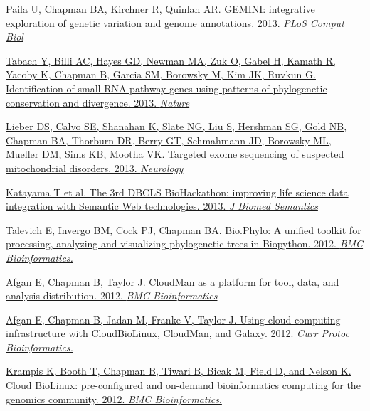 \documentclass[10pt]{article}
\makeatletter
\newlength{\bibhang}
\newlength{\bibsep}
 {\@listi \global\bibsep\itemsep \global\advance\bibsep by\parsep}
\newenvironment{bibsection}%
        {\vspace{-\baselineskip}\begin{list}{}{%
       \setlength{\leftmargin}{\bibhang}%
       \setlength{\itemindent}{-\leftmargin}%
       \setlength{\itemsep}{\bibsep}%
       \setlength{\parsep}{\z@}%
        \setlength{\partopsep}{0pt}%
        \setlength{\topsep}{0pt}}}
        {\end{list}\vspace{-.6\baselineskip}}
\makeatother
\begin{document}
\begin{bibsection}
  \item \href{http://journals.plos.org/ploscompbiol/article?id=10.1371/journal.pcbi.1003153}
    {Paila U, Chapman BA, Kirchner R, Quinlan AR.
     GEMINI: integrative exploration of genetic variation and genome
     annotations. 2013. \textit{PLoS Comput Biol}}

  \item \href{http://www.nature.com/nature/journal/v493/n7434/full/nature11779.html}
    {Tabach Y, Billi AC, Hayes GD, Newman MA, Zuk O, Gabel H, Kamath R, Yacoby
     K, Chapman B, Garcia SM, Borowsky M, Kim JK, Ruvkun G.
     Identification of small RNA pathway genes using patterns of phylogenetic
     conservation and divergence. 2013. \textit{Nature}}

  \item \href{http://www.neurology.org/content/80/19/1762.long}
    {Lieber DS, Calvo SE, Shanahan K, Slate NG, Liu S, Hershman SG, Gold NB,
     Chapman BA, Thorburn DR, Berry GT, Schmahmann JD, Borowsky ML, Mueller DM,
     Sims KB, Mootha VK.
     Targeted exome sequencing of suspected mitochondrial disorders. 2013.
     \textit{Neurology}}

  \item \href{http://www.jbiomedsem.com/content/4/1/6}
    {Katayama T et al.
    The 3rd DBCLS BioHackathon: improving life science data integration with
    Semantic Web technologies. 2013. \textit{J Biomed Semantics}}

  \item \href{http://www.biomedcentral.com/1471-2105/13/209}
    {Talevich E, Invergo BM, Cock PJ, Chapman BA.
    Bio.Phylo: A unified toolkit for processing, analyzing and
    visualizing phylogenetic trees in Biopython. 2012.
    \textit{BMC Bioinformatics.}}

  \item \href{http://www.biomedcentral.com/1471-2105/13/315}
    {Afgan E, Chapman B, Taylor J.
     CloudMan as a platform for tool, data, and analysis distribution. 2012.
     \textit{BMC Bioinformatics}}

  \item \href{http://cda.currentprotocols.com/WileyCDA/CPUnit/refId-bi1109.html}
    {Afgan E, Chapman B, Jadan M, Franke V, Taylor J. Using cloud
      computing infrastructure with CloudBioLinux, CloudMan, and
      Galaxy. 2012. \textit{Curr Protoc Bioinformatics.}}

  \item \href{http://www.biomedcentral.com/1471-2105/13/42/}
   {Krampis K, Booth T, Chapman B, Tiwari B, Bicak M, Field D, and Nelson K.
    Cloud BioLinux: pre-configured and on-demand bioinformatics
    computing for the genomics community. 2012. \textit{BMC Bioinformatics}.}


\end{bibsection}
\end{document}
